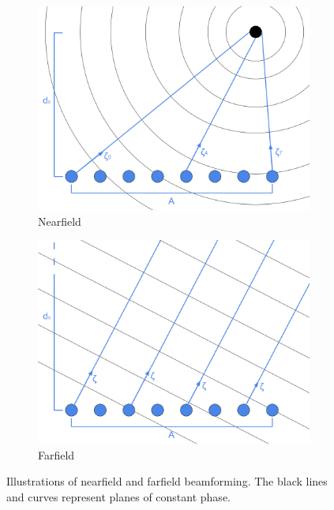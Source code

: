 \begin{figure}[ht]
    \centering
    \begin{subfigure}[b]{0.48\linewidth}
        \includegraphics[width=\linewidth]{./images/background/nearfield.png}
        \caption{Nearfield}
	 \label{Illustration of nearfield beamforming.}
    \end{subfigure}
    \quad
    \begin{subfigure}[b]{0.48\linewidth}
        \includegraphics[width=\linewidth]{./images/background/farfield.png}
        \caption{Farfield}
	 \label{Illustration of farfield beamforming.}
    \end{subfigure}
	\caption[Illustrations of nearfield and farfield beamforming.]{Illustrations of nearfield and farfield beamforming. The black lines and curves represent planes of constant phase.}
	\label{fig:farfield}
\end{figure}


